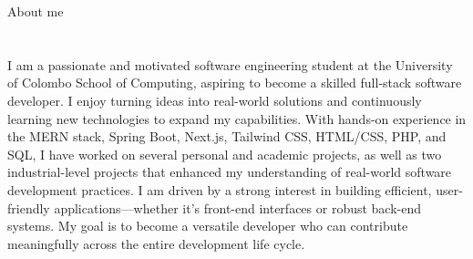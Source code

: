 \begin{rubric}{About me} \end{rubric}
\section{}
I am a passionate and motivated software engineering student at the University of Colombo School of Computing, aspiring to become a skilled full-stack software developer. I enjoy turning ideas into real-world solutions and continuously learning new technologies to expand my capabilities.
With hands-on experience in the MERN stack, Spring Boot, Next.js, Tailwind CSS, HTML/CSS, PHP, and SQL, I have worked on several personal and academic projects, as well as two industrial-level projects that enhanced my understanding of real-world software development practices.
I am driven by a strong interest in building efficient, user-friendly applications—whether it’s front-end interfaces or robust back-end systems. My goal is to become a versatile developer who can contribute meaningfully across the entire development life cycle.

